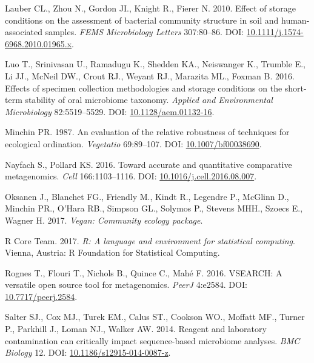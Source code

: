 \documentclass[12pt,]{article}
\begin{document}
\hypertarget{ref-storage_Lauber_2010}{}
Lauber CL., Zhou N., Gordon JI., Knight R., Fierer N. 2010. Effect of
storage conditions on the assessment of bacterial community structure in
soil and human-associated samples. \emph{FEMS Microbiology Letters}
307:80--86. DOI:
\href{https://doi.org/10.1111/j.1574-6968.2010.01965.x}{10.1111/j.1574-6968.2010.01965.x}.

\hypertarget{ref-preservation_Luo_2016}{}
Luo T., Srinivasan U., Ramadugu K., Shedden KA., Neiswanger K., Trumble
E., Li JJ., McNeil DW., Crout RJ., Weyant RJ., Marazita ML., Foxman B.
2016. Effects of specimen collection methodologies and storage
conditions on the short-term stability of oral microbiome taxonomy.
\emph{Applied and Environmental Microbiology} 82:5519--5529. DOI:
\href{https://doi.org/10.1128/aem.01132-16}{10.1128/aem.01132-16}.

\hypertarget{ref-bc_index_Minchin1987}{}
Minchin PR. 1987. An evaluation of the relative robustness of techniques
for ecological ordination. \emph{Vegetatio} 69:89--107. DOI:
\href{https://doi.org/10.1007/bf00038690}{10.1007/bf00038690}.

\hypertarget{ref-metagenomcis_bias_Nayfach_2016}{}
Nayfach S., Pollard KS. 2016. Toward accurate and quantitative
comparative metagenomics. \emph{Cell} 166:1103--1116. DOI:
\href{https://doi.org/10.1016/j.cell.2016.08.007}{10.1016/j.cell.2016.08.007}.

\hypertarget{ref-vegan_citation}{}
Oksanen J., Blanchet FG., Friendly M., Kindt R., Legendre P., McGlinn
D., Minchin PR., O'Hara RB., Simpson GL., Solymos P., Stevens MHH.,
Szoecs E., Wagner H. 2017. \emph{Vegan: Community ecology package}.

\hypertarget{ref-r_citation_2017}{}
R Core Team. 2017. \emph{R: A language and environment for statistical
computing}. Vienna, Austria: R Foundation for Statistical Computing.

\hypertarget{ref-vsearch_Rognes_2016}{}
Rognes T., Flouri T., Nichols B., Quince C., Mahé F. 2016. VSEARCH: A
versatile open source tool for metagenomics. \emph{PeerJ} 4:e2584. DOI:
\href{https://doi.org/10.7717/peerj.2584}{10.7717/peerj.2584}.

\hypertarget{ref-contamination_Salter2014}{}
Salter SJ., Cox MJ., Turek EM., Calus ST., Cookson WO., Moffatt MF.,
Turner P., Parkhill J., Loman NJ., Walker AW. 2014. Reagent and
laboratory contamination can critically impact sequence-based microbiome
analyses. \emph{BMC Biology} 12. DOI:
\href{https://doi.org/10.1186/s12915-014-0087-z}{10.1186/s12915-014-0087-z}.
\end{document}
